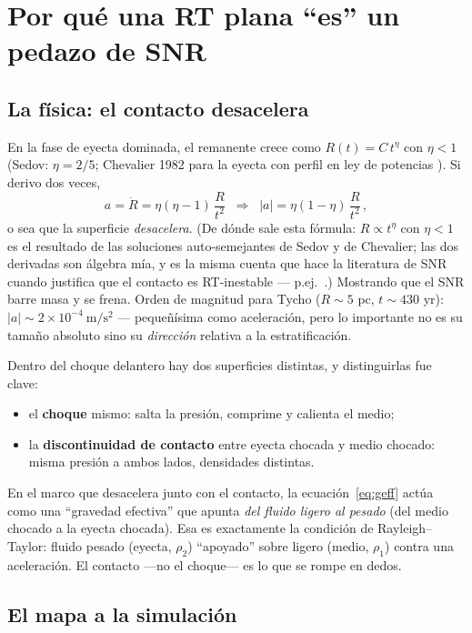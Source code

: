 \documentclass[11pt,a4paper]{article}
\begin{document}
\section{Por qué una RT plana ``es'' un pedazo de SNR}

\subsection{La física: el contacto desacelera}

En la fase de eyecta dominada, el remanente crece como $R(t)=C\,t^\eta$ con $\eta<1$
(Sedov: $\eta=2/5$; Chevalier 1982 para la eyecta con perfil en ley de potencias
\cite{warren2013, chevalier1982, sedov1959}). Si derivo dos veces,
\begin{equation}
a=\ddot{R}=\eta(\eta-1)\,\frac{R}{t^2}
\;\;\Longrightarrow\;\;
|a|=\eta(1-\eta)\,\frac{R}{t^2}\,,
\label{eq:geff}
\end{equation}
o sea que la superficie \emph{desacelera}. (De dónde sale esta fórmula: $R\propto t^\eta$
con $\eta<1$ es el resultado de las soluciones auto-semejantes de Sedov y de Chevalier;
las dos derivadas son álgebra mía, y es la misma cuenta que hace la literatura de SNR
cuando justifica que el contacto es RT-inestable --- p.ej.\ \cite{orlando2012}.) Mostrando que el
SNR barre masa y se frena. Orden de magnitud para Tycho ($R\sim5$ pc, $t\sim430$ yr):
$|a|\sim2\times10^{-4}\ \mathrm{m/s^2}$ --- pequeñísima como aceleración, pero lo
importante no es su tamaño absoluto sino su \emph{dirección} relativa a la estratificación.

Dentro del choque delantero hay dos superficies distintas, y distinguirlas fue clave:
\begin{itemize}[nosep]
  \item el \textbf{choque} mismo: salta la presión, comprime y calienta el medio;
  \item la \textbf{discontinuidad de contacto} entre eyecta chocada y medio chocado:
  misma presión a ambos lados, densidades distintas.
\end{itemize}
En el marco que desacelera junto con el contacto, la ecuación~\eqref{eq:geff} actúa como
una ``gravedad efectiva'' que apunta \emph{del fluido ligero al pesado} (del medio chocado
a la eyecta chocada). Esa es exactamente la condición de Rayleigh--Taylor: fluido pesado
(eyecta, $\rho_2$) ``apoyado'' sobre ligero (medio, $\rho_1$) contra una aceleración. El
contacto ---no el choque--- es lo que se rompe en dedos.

\subsection{El mapa a la simulación}
\end{document}
